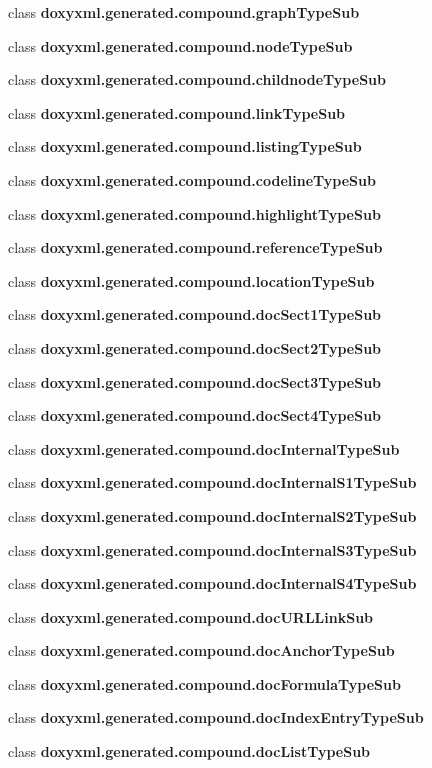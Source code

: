 \begin{DoxyCompactItemize}
class {\bf doxyxml.\+generated.\+compound.\+graph\+Type\+Sub}
\item 
class {\bf doxyxml.\+generated.\+compound.\+node\+Type\+Sub}
\item 
class {\bf doxyxml.\+generated.\+compound.\+childnode\+Type\+Sub}
\item 
class {\bf doxyxml.\+generated.\+compound.\+link\+Type\+Sub}
\item 
class {\bf doxyxml.\+generated.\+compound.\+listing\+Type\+Sub}
\item 
class {\bf doxyxml.\+generated.\+compound.\+codeline\+Type\+Sub}
\item 
class {\bf doxyxml.\+generated.\+compound.\+highlight\+Type\+Sub}
\item 
class {\bf doxyxml.\+generated.\+compound.\+reference\+Type\+Sub}
\item 
class {\bf doxyxml.\+generated.\+compound.\+location\+Type\+Sub}
\item 
class {\bf doxyxml.\+generated.\+compound.\+doc\+Sect1\+Type\+Sub}
\item 
class {\bf doxyxml.\+generated.\+compound.\+doc\+Sect2\+Type\+Sub}
\item 
class {\bf doxyxml.\+generated.\+compound.\+doc\+Sect3\+Type\+Sub}
\item 
class {\bf doxyxml.\+generated.\+compound.\+doc\+Sect4\+Type\+Sub}
\item 
class {\bf doxyxml.\+generated.\+compound.\+doc\+Internal\+Type\+Sub}
\item 
class {\bf doxyxml.\+generated.\+compound.\+doc\+Internal\+S1\+Type\+Sub}
\item 
class {\bf doxyxml.\+generated.\+compound.\+doc\+Internal\+S2\+Type\+Sub}
\item 
class {\bf doxyxml.\+generated.\+compound.\+doc\+Internal\+S3\+Type\+Sub}
\item 
class {\bf doxyxml.\+generated.\+compound.\+doc\+Internal\+S4\+Type\+Sub}
\item 
class {\bf doxyxml.\+generated.\+compound.\+doc\+U\+R\+L\+Link\+Sub}
\item 
class {\bf doxyxml.\+generated.\+compound.\+doc\+Anchor\+Type\+Sub}
\item 
class {\bf doxyxml.\+generated.\+compound.\+doc\+Formula\+Type\+Sub}
\item 
class {\bf doxyxml.\+generated.\+compound.\+doc\+Index\+Entry\+Type\+Sub}
\item 
class {\bf doxyxml.\+generated.\+compound.\+doc\+List\+Type\+Sub}
\item 

\end{DoxyCompactItemize}
